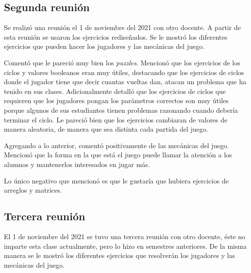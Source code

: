 \subsection{Segunda reunión}
Se realizó una reunión el 1 de noviembre del 2021 con otro docente. A partir de esta reunión se usaron los ejercicios rediseñados. Se le mostró los diferentes ejercicios que pueden hacer los jugadores y las mecánicas del juego.

Comentó que le pareció muy bien los \textit{puzzles}. Mencionó que los ejercicios de los ciclos y valores booleanos eran muy útiles, destacando que los ejercicios de ciclos donde el jugador tiene que decir cuantas vueltas dan, atacan un problema que ha tenido en sus clases. Adicionalmente detalló que los ejercicios de ciclos que requieren que los jugadores pongan los parámetros correctos son muy útiles porque algunos de sus estudiantes tienen problemas razonando cuando debería terminar el ciclo. Le pareció bien que los ejercicios cambiaran de valores de manera aleatoria, de manera que sea distinta cada partida del juego. 

Agregando a lo anterior, comentó positivamente de las mecánicas del juego. Mencionó que la forma en la que está el juego puede llamar la atención a los alumnos y mantenerlos interesados en jugar más.

Lo único negativo que mencionó es que le gustaría que hubiera ejercicios de arreglos y matrices.

\subsection{Tercera reunión}
El 1 de noviembre del 2021 se tuvo una tercera reunión con otro docente, éste no imparte esta clase actualmente, pero lo hizo en semestres anteriores. De la misma manera se le mostró los diferentes ejercicios que resolverán los jugadores y las mecánicas del juego.

